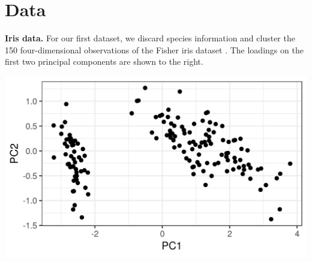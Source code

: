 \documentclass[a0,plainsections,30pt]{sciposter}\usepackage[]{graphicx}\usepackage[]{color}
\newenvironment{knitrout}{}{} %
\begin{document}
\hfill \vrule \hfill
\begin{minipage}[t]{0.45\textwidth}




\section*{Data}
\vspace{-0.3in}
%
\begin{minipage}[t]{0.49\textwidth}
%
\textbf{Iris data.}
For our first dataset, we discard species
information and cluster the 150 four-dimensional observations of the Fisher iris
dataset \citep{iris_data_anderson}.
The loadings on the first two principal components are shown
to the right.
%
\end{minipage}
%
\begin{minipage}[t]{0.49\textwidth}

%
\vspace{-0.4in}
\begin{knitrout}
\color{fgcolor}

{\centering \includegraphics[width=0.98\linewidth,height=0.588\linewidth]{figure/iris_pca-1} 

}



\end{knitrout}
\end{minipage}
%

\vspace{1em}


\end{minipage}
\end{document}
